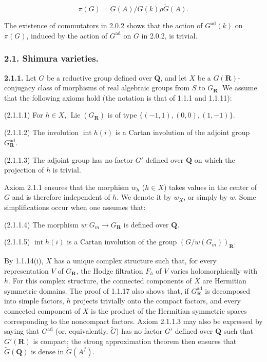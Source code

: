 \documentclass[10pt,a4paper]{article}
\begin{document}
\[
\pi(G)=G(A)/G(k)\rho\widetilde G(A). \tag{2.0.15.1}
\]

The existence of commutators in 2.0.2 shows that the action of \(G^{\mathrm{ad}}(k)\) on \(\pi(G)\), induced by the action of \(G^{\mathrm{ad}}\) on \(G\) in 2.0.2, is trivial.

\subsubsection{2.1. Shimura varieties.}

\textbf{2.1.1.} Let \(G\) be a reductive group defined over \(\mathbf Q\), and let \(X\) be a \(G(\mathbf R)\)-conjugacy class of morphisms of real algebraic groups from \(S\) to \(G_{\mathbf R}\). We assume that the following axioms hold (the notation is that of 1.1.1 and 1.1.11):

(2.1.1.1) For \(h\in X\), \(\operatorname{Lie}(G_{\mathbf R})\) is of type \(\{(-1,1),(0,0),(1,-1)\}\).

(2.1.1.2) The involution \(\operatorname{int}h(i)\) is a Cartan involution of the adjoint group \(G_{\mathbf R}^{\mathrm{ad}}\).

(2.1.1.3) The adjoint group has no factor \(G'\) defined over \(\mathbf Q\) on which the projection of \(h\) is trivial.

Axiom 2.1.1 ensures that the morphism \(w_h\) (\(h\in X\)) takes values in the center of \(G\) and is therefore independent of \(h\). We denote it by \(w_X\), or simply by \(w\). Some simplifications occur when one assumes that:

(2.1.1.4) The morphism \(w:G_m\to G_{\mathbf R}\) is defined over \(\mathbf Q\).

(2.1.1.5) \(\operatorname{int}h(i)\) is a Cartan involution of the group \((G/w(G_m))_{\mathbf R}\).

By 1.1.14(i), \(X\) has a unique complex structure such that, for every representation \(V\) of \(G_{\mathbf R}\), the Hodge filtration \(F_h\) of \(V\) varies holomorphically with \(h\). For this complex structure, the connected components of \(X\) are Hermitian symmetric domains. The proof of 1.1.17 also shows that, if \(G_{\mathbf R}^{\mathrm{ad}}\) is decomposed into simple factors, \(h\) projects trivially onto the compact factors, and every connected component of \(X\) is the product of the Hermitian symmetric spaces corresponding to the noncompact factors. Axiom 2.1.1.3 may also be expressed by saying that \(G^{\mathrm{ad}}\) (or, equivalently, \(\widetilde G\)) has no factor \(G'\) defined over \(\mathbf Q\) such that \(G'(\mathbf R)\) is compact; the strong approximation theorem then ensures that \(\widetilde G(\mathbf Q)\) is dense in \(\widetilde G(A^f)\).
\end{document}
